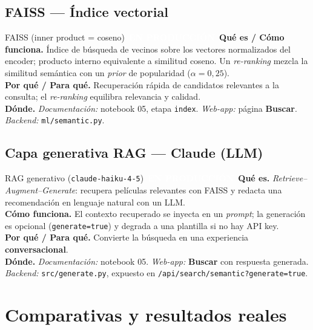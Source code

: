 \documentclass[11pt,a4paper]{article}
\newcommand{\code}[1]{\textcolor{omnidark}{\texttt{#1}}}
\newcommand{\enprod}{\textcolor{white}{\colorbox{omniaccent}{\scriptsize\bfseries\,EN PRODUCCIÓN\,}}}
\begin{document}
\subsection{FAISS — Índice vectorial}
\begin{modelcard}{FAISS (inner product = coseno) \hfill \enprod}
\textbf{Qué es / Cómo funciona.} Índice de búsqueda de vecinos sobre los vectores normalizados del encoder; producto interno equivalente a similitud coseno. Un \textit{re-ranking} mezcla la similitud semántica con un \textit{prior} de popularidad ($\alpha=0{,}25$).\\[3pt]
\textbf{Por qué / Para qué.} Recuperación rápida de candidatos relevantes a la consulta; el \textit{re-ranking} equilibra relevancia y calidad.\\[3pt]
\textbf{Dónde.} \emph{Documentación:} notebook 05, etapa \code{index}. \emph{Web-app:} página \textbf{Buscar}. \emph{Backend:} \code{ml/semantic.py}.
\end{modelcard}

\subsection{Capa generativa RAG — Claude (LLM)}
\begin{modelcard}{RAG generativo (\texttt{claude-haiku-4-5}) \hfill \enprod}
\textbf{Qué es.} \textit{Retrieve--Augment--Generate}: recupera películas relevantes con FAISS y redacta una recomendación en lenguaje natural con un LLM.\\[3pt]
\textbf{Cómo funciona.} El contexto recuperado se inyecta en un \textit{prompt}; la generación es opcional (\code{generate=true}) y degrada a una plantilla si no hay API key.\\[3pt]
\textbf{Por qué / Para qué.} Convierte la búsqueda en una experiencia \textbf{conversacional}.\\[3pt]
\textbf{Dónde.} \emph{Documentación:} notebook 05. \emph{Web-app:} \textbf{Buscar} con respuesta generada. \emph{Backend:} \code{src/generate.py}, expuesto en \code{/api/search/semantic?generate=true}.
\end{modelcard}

\section{Comparativas y resultados reales}
\label{sec:comparativas}
\end{document}
